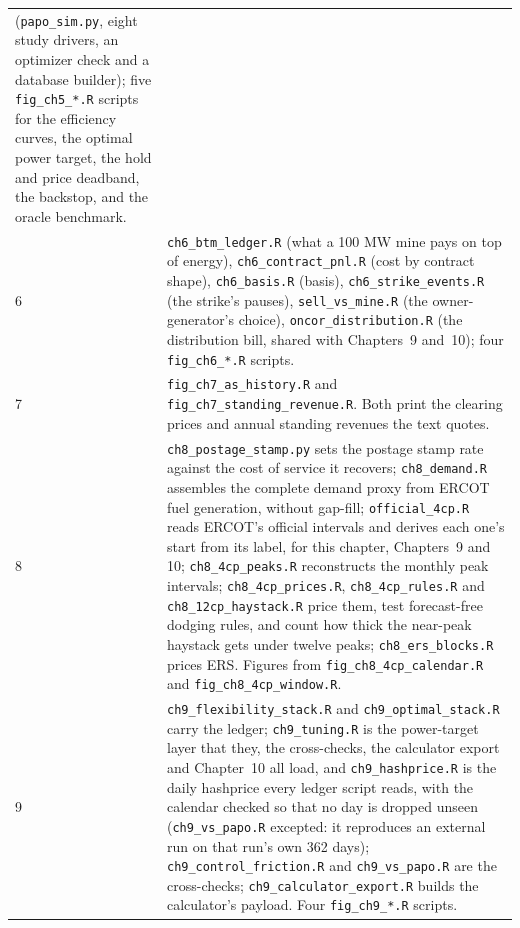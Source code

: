 \begin{table}[htbp]
\begin{tabular}{@{}p{11mm}p{88mm}@{}}
        (\texttt{papo\_sim.py}, eight study drivers, an optimizer check and a
        database builder); five
        \texttt{fig\_ch5\_*.R} scripts for the efficiency curves, the optimal
        power target, the hold and price deadband, the backstop, and the oracle
        benchmark. \\
    6 & \texttt{ch6\_btm\_ledger.R} (what a 100 MW mine pays on top of
        energy), \texttt{ch6\_contract\_pnl.R} (cost by contract shape),
        \texttt{ch6\_basis.R} (basis), \texttt{ch6\_strike\_events.R} (the
        strike's pauses), \texttt{sell\_vs\_mine.R} (the owner-generator's
        choice), \texttt{oncor\_distribution.R} (the distribution bill, shared with Chapters~9 and~10); four \texttt{fig\_ch6\_*.R} scripts. \\
    7 & \texttt{fig\_ch7\_as\_history.R} and
        \texttt{fig\_ch7\_standing\_revenue.R}. Both print the clearing prices
        and annual standing revenues the text quotes. \\
    8 & \texttt{ch8\_postage\_stamp.py} sets the postage stamp rate against
        the cost of service it recovers; \texttt{ch8\_demand.R} assembles the
        complete demand proxy from ERCOT fuel generation, without gap-fill; \texttt{official\_4cp.R} reads ERCOT's official
        intervals and derives each one's start from its label, for this
        chapter, Chapters~9 and 10; \texttt{ch8\_4cp\_peaks.R} reconstructs the monthly peak intervals;
        \texttt{ch8\_4cp\_prices.R}, \texttt{ch8\_4cp\_rules.R} and
        \texttt{ch8\_12cp\_haystack.R} price them, test forecast-free dodging
        rules, and count how thick the near-peak haystack gets under twelve
        peaks; \texttt{ch8\_ers\_blocks.R} prices ERS. Figures from \texttt{fig\_ch8\_4cp\_calendar.R} and
        \texttt{fig\_ch8\_4cp\_window.R}. \\
    9 & \texttt{ch9\_flexibility\_stack.R} and \texttt{ch9\_optimal\_stack.R}
        carry the ledger; \texttt{ch9\_tuning.R} is the power-target layer that they,
        the cross-checks, the calculator export and Chapter~10 all load, and
        \texttt{ch9\_hashprice.R} is the daily hashprice every ledger
        script reads, with the calendar checked so that no day is dropped
        unseen (\texttt{ch9\_vs\_papo.R} excepted: it reproduces an
        external run on that run's own 362 days);
        \texttt{ch9\_control\_friction.R} and \texttt{ch9\_vs\_papo.R} are the
        cross-checks; \texttt{ch9\_calculator\_export.R} builds the
        calculator's payload. Four \texttt{fig\_ch9\_*.R} scripts. \\

\end{tabular}
\end{table}
